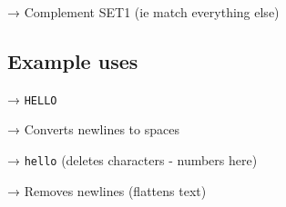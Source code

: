 \begin{Shaded}
\begin{Highlighting}[]
 
\end{Highlighting}
\end{Shaded}

→ Complement SET1 (ie match everything else)

    \subsection{Example uses}\label{example-uses}

\begin{Shaded}
\begin{Highlighting}[]
  \KeywordTok{|}   
\end{Highlighting}
\end{Shaded}

→ \texttt{HELLO}

    \begin{Shaded}
\begin{Highlighting}[]
\KeywordTok{\textasciigrave{}}  
\end{Highlighting}
\end{Shaded}

→ Converts newlines to spaces

    \begin{Shaded}
\begin{Highlighting}[]
  \KeywordTok{|}   
\end{Highlighting}
\end{Shaded}

→ \texttt{hello} (deletes characters - numbers here)

    \begin{Shaded}
\begin{Highlighting}[]
   \OperatorTok{\textless{}}
\end{Highlighting}
\end{Shaded}

→ Removes newlines (flattens text)


    
    
    

